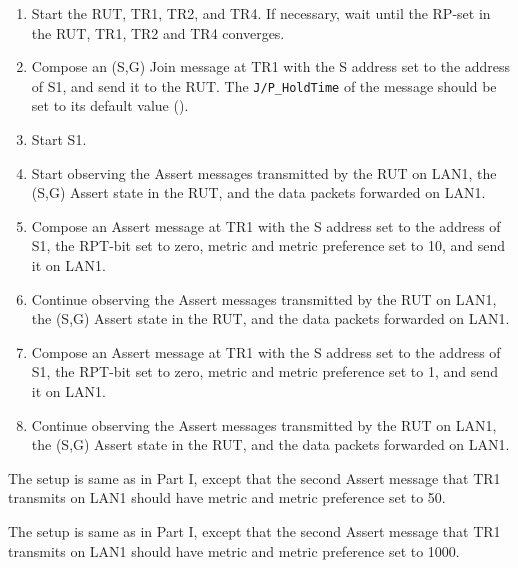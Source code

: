\documentclass[11pt]{report}
\begin{document}
\begin{enumerate}

  \item Start the RUT, TR1, TR2, and TR4. If necessary, wait until the RP-set
  in the RUT, TR1, TR2 and TR4 converges.

  \item Compose an (S,G) Join message at TR1 with the S address set to the
  address of S1, and send it to the RUT.
  The \verb=J/P_HoldTime= of the message should be set to its default
  value ({\PimsmJPHoldTime}).

  \item Start S1.

  \item Start observing the Assert messages transmitted by the RUT on
  LAN1, the (S,G) Assert state in the RUT, and the data packets forwarded on
  LAN1.

  \item Compose an Assert message at TR1 with the S address set to the
  address of S1, the RPT-bit set to zero, metric and metric preference set to
  10, and send it on LAN1.

  \item Continue observing the Assert messages transmitted by the RUT on
  LAN1, the (S,G) Assert state in the RUT, and the data packets forwarded on
  LAN1.

  \item Compose an Assert message at TR1 with the S address set to the
  address of S1, the RPT-bit set to zero, metric and metric preference set to
  1, and send it on LAN1.

  \item Continue observing the Assert messages transmitted by the RUT on
  LAN1, the (S,G) Assert state in the RUT, and the data packets forwarded on
  LAN1.

\end{enumerate}


The setup is same as in Part I, except that the second Assert message that TR1
transmits on LAN1 should have metric and metric preference set to 50.


The setup is same as in Part I, except that the second Assert message that TR1
transmits on LAN1 should have metric and metric preference set to 1000.
\end{document}
